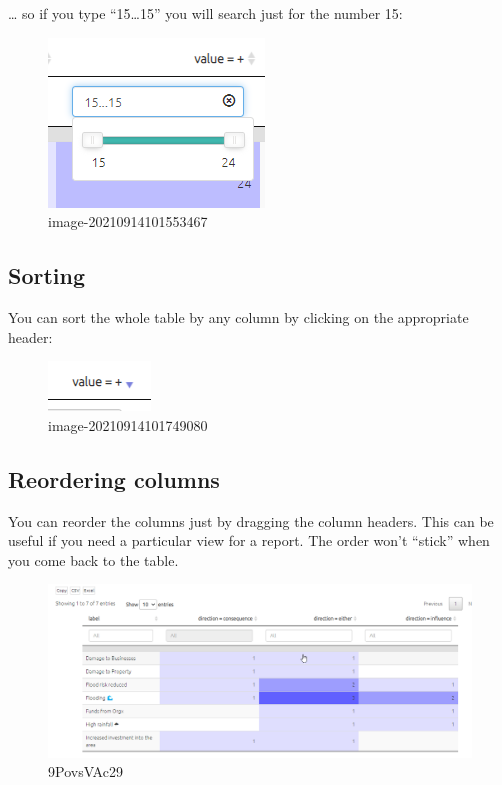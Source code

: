 \documentclass[
]{book}
\begin{document}
\ldots{} so if you type ``15\ldots15'' you will search just for the number 15:

\begin{figure}
\centering
\includegraphics{_assets/image-20210914101553467.png}
\caption{image-20210914101553467}
\end{figure}

\hypertarget{sorting}{%
\subsection{Sorting}\label{sorting}}

You can sort the whole table by any column by clicking on the appropriate header:

\begin{figure}
\centering
\includegraphics{_assets/image-20210914101749080.png}
\caption{image-20210914101749080}
\end{figure}

\hypertarget{reordering-columns}{%
\subsection{Reordering columns}\label{reordering-columns}}

You can reorder the columns just by dragging the column headers. This can be useful if you need a particular view for a report. The order won't ``stick'' when you come back to the table.

\begin{figure}
\centering
\includegraphics{_assets/9PovsVAc29.gif}
\caption{9PovsVAc29}
\end{figure}
\end{document}
